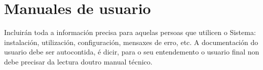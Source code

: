 \chapter{Manuales de usuario}
\label{chap:usuario}

Incluirán toda a información precisa para aquelas persoas que utilicen o Sistema: instalación, utilización, configuración, mensaxes de erro, etc. A documentación do usuario debe ser autocontida, é dicir, para o seu entendemento o usuario final non debe precisar da lectura doutro manual técnico.
